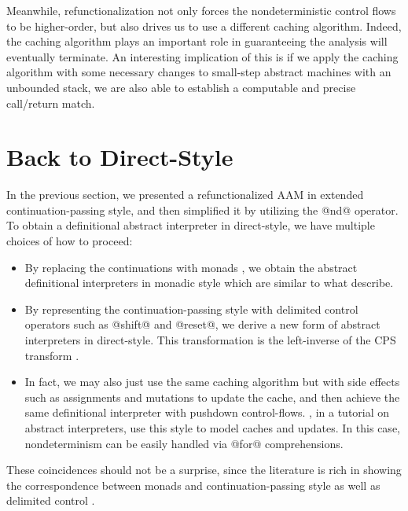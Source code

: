 \documentclass[acmsmall, screen]{acmart}\settopmatter{}
\begin{document}
Meanwhile, refunctionalization not only forces the nondeterministic control flows to be higher-order,
but also drives us to use a different caching algorithm.
Indeed, the caching algorithm plays an important role in guaranteeing the analysis will eventually terminate.
An interesting implication of this is if we apply the caching algorithm with some
necessary changes to small-step abstract machines with an unbounded stack, we are
also able to establish a computable and precise call/return match.

\section{Back to Direct-Style} \label{directstyle}

In the previous section, we presented a refunctionalized AAM in extended continuation-passing style,
and then simplified it by utilizing the @nd@ operator.
To obtain a definitional abstract interpreter in direct-style, we have multiple choices of how to proceed:

\begin{itemize}
  \item By replacing the continuations with monads \cite{filinski1994representing},
    we obtain the abstract definitional interpreters in monadic style which are similar to what
    \citet{darais2017abstracting} describe.
  \item By representing the continuation-passing style with delimited control operators
    such as @shift@ and @reset@, we derive a new form of abstract interpreters in direct-style.
    This transformation is the left-inverse of the CPS transform \cite{DBLP:journals/scp/Danvy94, DBLP:conf/lfp/DanvyL92}.
  \item In fact, we may also just use the same caching algorithm but with side effects such as
    assignments and mutations to update the cache, and then achieve the same definitional
    interpreter with pushdown control-flows. , in a tutorial on abstract
    interpreters, use this style to model caches and updates.
    In this case, nondeterminism can be easily handled via @for@ comprehensions.
\end{itemize}

These coincidences should not be a surprise, since the literature is rich
in showing the correspondence between monads and continuation-passing style as well as
delimited control \cite{Danvy:1990:AC:91556.91622, wadler1992essence,
danvy1992representing, moggi1991notions}.
\end{document}
